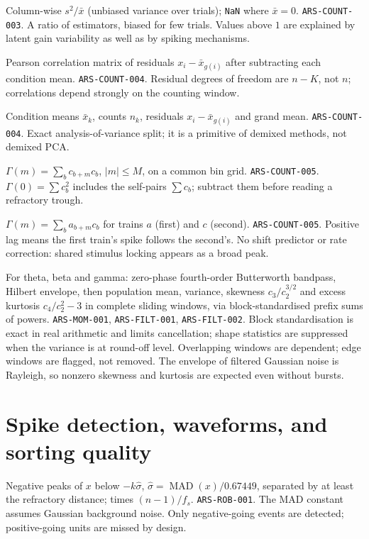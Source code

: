 {Column-wise $s^2/\bar x$ (unbiased variance over trials); \texttt{NaN} where $\bar x=0$.}
{\texttt{ARS-COUNT-003}.}
{A ratio of estimators, biased for few trials. Values above $1$ are explained by latent gain variability as well as by spiking mechanisms.}

{Pearson correlation matrix of residuals $x_i-\bar x_{g(i)}$ after subtracting each condition mean.}
{\texttt{ARS-COUNT-004}.}
{Residual degrees of freedom are $n-K$, not $n$; correlations depend strongly on the counting window.}

{Condition means $\bar x_k$, counts $n_k$, residuals $x_i-\bar x_{g(i)}$ and grand mean.}
{\texttt{ARS-COUNT-004}.}
{Exact analysis-of-variance split; it is a primitive of demixed methods, not demixed PCA.}

{$\Gamma(m)=\sum_bc_{b+m}c_b$, $|m|\le M$, on a common bin grid.}
{\texttt{ARS-COUNT-005}.}
{$\Gamma(0)=\sum c_b^2$ includes the self-pairs $\sum c_b$; subtract them before reading a refractory trough.}

{$\Gamma(m)=\sum_ba_{b+m}c_b$ for trains $a$ (first) and $c$ (second).}
{\texttt{ARS-COUNT-005}.}
{Positive lag means the first train's spike follows the second's. No shift predictor or rate correction: shared stimulus locking appears as a broad peak.}

{For theta, beta and gamma: zero-phase fourth-order Butterworth bandpass, Hilbert envelope, then population mean, variance, skewness $c_3/c_2^{3/2}$ and excess kurtosis $c_4/c_2^2-3$ in complete sliding windows, via block-standardised prefix sums of powers.}
{\texttt{ARS-MOM-001}, \texttt{ARS-FILT-001}, \texttt{ARS-FILT-002}.}
{Block standardisation is exact in real arithmetic and limits cancellation; shape statistics are suppressed when the variance is at round-off level. Overlapping windows are dependent; edge windows are flagged, not removed. The envelope of filtered Gaussian noise is Rayleigh, so nonzero skewness and kurtosis are expected even without bursts.}

\section{Spike detection, waveforms, and sorting quality}
{Negative peaks of $x$ below $-k\hat\sigma$, $\hat\sigma=\operatorname{MAD}(x)/0.67449$, separated by at least the refractory distance; times $(n-1)/f_s$.}
{\texttt{ARS-ROB-001}.}
{The MAD constant assumes Gaussian background noise. Only negative-going events are detected; positive-going units are missed by design.}

